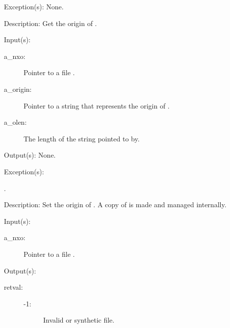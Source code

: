 \begin{capi}
\begin{capilist}
	\item[Exception(s): ] None.
	\item[Description: ]
		Get the origin of .
	\end{capilist}
\label{nxo_file_origin_set}
	\begin{capilist}
	\item[Input(s): ]
		\begin{description}\item[]
		\item[a\_nxo: ]
			Pointer to a file .
		\item[a\_origin: ]
			Pointer to a string that represents the origin of
			.
		\item[a\_olen: ]
			The length of the string pointed to by.
		\end{description}
	\item[Output(s): ] None.
	\item[Exception(s): ]
		\begin{description}\item[]
		\item[.]
		\end{description}
	\item[Description: ]
		Set the origin of .  A copy of  is
		made and managed internally.
	\end{capilist}
\label{nxo_file_fd_get}
	\begin{capilist}
	\item[Input(s): ]
		\begin{description}\item[]
		\item[a\_nxo: ]
			Pointer to a file \classname{nxo}.
		\end{description}
	\item[Output(s): ]
		\begin{description}\item[]
		\item[retval: ]
			\begin{description}\item[]
			\item[-1: ]
				Invalid or synthetic file.

\end{description}
\end{description}
\end{capilist}
\end{capi}
